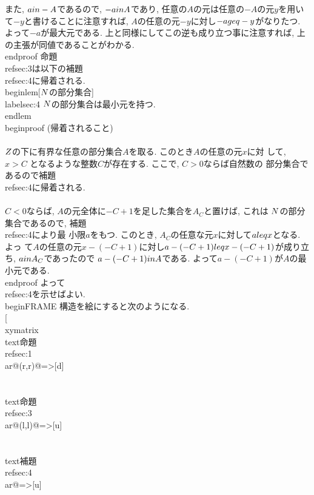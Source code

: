  また, $a\\in -A$であるので, $-a\\in A$であり, 任意の$A$の元は任意の$-A$の元$y$を用いて$-y$と書けることに注意すれば, $A$の任意の元$-y$に対し$-a\\geq -y$がなりたつ. よって$-a$が最大元である.
 上と同様にしてこの逆も成り立つ事に注意すれば, 上の主張が同値であることがわかる.
\\end{proof}
命題\\ref{sec:3}は以下の補題\\ref{sec:4}に帰着される.
\\begin{lem}[$\\N$の部分集合]
 \\label{sec:4}
 $\\N$の部分集合は最小元を持つ.
\\end{lem}
\\begin{proof}
 (帰着されること)\\\\
 $\\Z$の下に有界な任意の部分集合$A$を取る. このとき$A$の任意の元$x$に対
 して, $x>C$ となるような整数$C$が存在する. ここで, $C>0$ならば自然数の
 部分集合であるので補題 \\ref{sec:4}に帰着される.\\\\
 $C<0$ならば, $A$の元全体に$-C+1$を足した集合を$A_C$と置けば, これは
 $\\N$の部分集合であるので, 補題\\ref{sec:4}により最
 小限$a$をもつ. このとき, $A_C$の任意な元$x$に対して$a\\leq x$となる. よっ
 て$A$の任意の元$x-(-C+1)$に対し$a-(-C+1)\\leq  x-(-C+1)$が成り立ち,
 $a\\in A_C$であったので $a-(-C+1)\\in A$である. よって$a-(-C+1)$が$A$の最
 小元である.
\\end{proof}
よって\\ref{sec:4}を示せばよい. 
\\begin{FRAME}
 構造を絵にすると次のようになる.
 \\[
 \\xymatrix{
 \\text{命題\\ref{sec:1}}\\ar@(r,r)@{=>}[d]\\\\
 \\text{命題\\ref{sec:3}}\\ar@(l,l)@{=>}[u]\\\\
 \\text{補題\\ref{sec:4}}\\ar@{=>}[u]
 }
